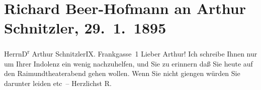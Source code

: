 

         
         \renewcommand{\erwaehntePersonen}{Personen: Richard Beer-Hofmann}
         \renewcommand{\erwaehnteOrte}{Orte: Frankgasse 1, I., Innere Stadt, IX., Alsergrund, Raimund-Theater, Wien}
         \renewcommand{\erwaehnteWerke}{}
               \section[Richard Beer-Hofmann an Arthur Schnitzler, 29. 1. 1895]{ Richard Beer-Hofmann an Arthur Schnitzler, 29. 1. 1895}\nopagebreak{}\rehead{ }\begin{ledgroupsized}[t]{13cm}\normalsize\beginnumbering{} \toendnotes[C]{\smallbreak\pagebreak[2]} 
\pstart{}{\pb}Herrn\pend{}\pstart{}D\textsuperscript{r} Arthur Schnitzler\pend{}\pstart{}IX. Frankgasse 1\pend{}{\bigskip}\pstart
           \noindent{}{\pb}Lieber Arthur! Ich schreibe Ihnen nur um Ihrer Indolenz ein wenig
               nachzuhelfen, und Sie zu erinnern daß Sie heute auf den Raimundtheaterabend gehen wollen. Wenn Sie nicht giengen würden Sie darunter
               leiden etc – Herzlichst \spacefill\mbox{R.}\pend
           
         
         \endnumbering{}\end{ledgroupsized}  \newcommand{\dateiname}{L00418}\newcommand{\titel}{Richard Beer-Hofmann an Arthur Schnitzler, 29. 1. 1895}\newcommand{\editorInnen}{Martin Anton Müller und Gerd-Hermann Susen}
      